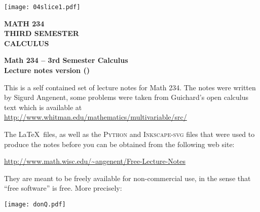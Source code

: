 \null \vfill

\noindent
\texttt{[image: 04slice1.pdf]}

\begin{flushright} \huge\sffamily\bfseries%
  MATH 234 \\
  THIRD SEMESTER \\
  CALCULUS\\[1in]
  \large \semester
\end{flushright}

\vfill \newpage
\vfill

\begin{center}
  \bfseries Math 234 -- 3rd Semester Calculus \\
  Lecture notes version \version (\semester)
\end{center}

\noindent This is a self contained set of lecture notes for Math 234. The
notes were written by Sigurd Angenent, some problems were
taken from Guichard's open calculus text which is available at
\url{http://www.whitman.edu/mathematics/multivariable/src/}

The \LaTeX\ files, as well as the \textsc{Python} and \textsc{Inkscape-svg}
files that were used to produce the notes before you can be obtained from
the following web site:
\begin{center}
  \url{http://www.math.wisc.edu/~angenent/Free-Lecture-Notes}
\end{center}
They are meant to be freely available for non-commercial use, in the sense
that ``free software'' is free. More precisely:

\bigskip

\begin{center}
\end{center}
\vfill
\begin{flushright}
\texttt{[image: donQ.pdf]}
\end{flushright}
\newpage

